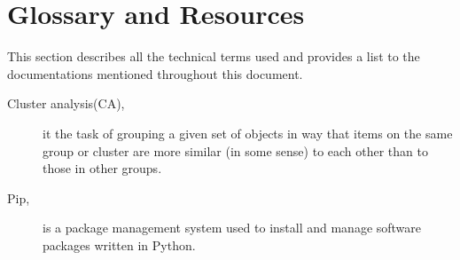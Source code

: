 \chapter{Glossary and Resources}

This section describes all the technical terms used and provides a list to the documentations mentioned throughout this document.

\label{sec:terms}

\begin{description}
\item [Cluster analysis(CA), ] it the task of grouping a given set of objects in way that items on the same group or cluster are more similar (in some sense) to each other than to those in other groups. 

\item [Pip,] is a package management system used to install and manage software packages written in Python.


\end{description}
